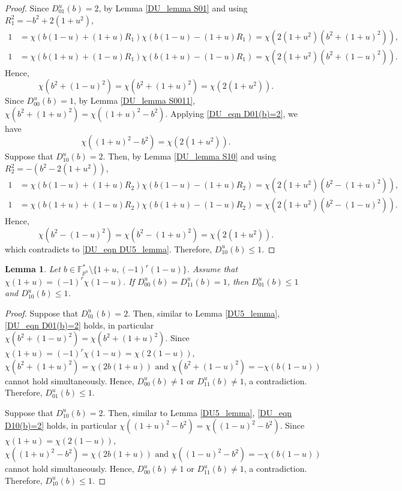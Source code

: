 \documentclass[11pt]{article}
\numberwithin{theorem}{section}
\newtheorem{lemma}[theorem]{Lemma}
\newcommand{\Fpnmul}{\mathbb{F}_{p^n}^*}
\begin{document}
\begin{proof}
	Since $D_{01}^u(b)=2$, by Lemma \ref{DU_lemma S01} and using $R_1^2=-b^2+2(1+u^2)$,
	\begin{align*}
		1&=\chi(b(1-u)+(1+u)R_1)\chi(b(1-u)-(1+u)R_1)  =\chi(2(1+u^2)(b^2+(1+u)^2)),\\
		1&=\chi(b(1+u)+(1-u)R_1)\chi(b(1+u)-(1-u)R_1) =\chi(2(1+u^2)(b^2+(1-u)^2)).
	\end{align*}
	Hence, 
	\begin{equation}\label{DU_eqn D01(b)=2}
		\chi(b^2+(1-u)^2)=\chi(b^2+(1+u)^2)=\chi(2(1+u^2)).
	\end{equation}
	Since $D_{00}^u(b)=1$, by Lemma \ref{DU_lemma S0011}, $\chi(b^2+(1+u)^2)=\chi((1+u)^2-b^2)$. Applying \eqref{DU_eqn D01(b)=2}, we have 
	\begin{equation}\label{DU_eqn DU5_lemma}
		\chi((1+u)^2-b^2)=\chi(2(1+u^2)).
	\end{equation}
	Suppose that $D_{10}^u(b)=2$. Then, by Lemma \ref{DU_lemma S10} and using $R_2^2=-\left(b^2-2(1+u^2)\right)$, 
	\begin{align*}
		1&=\chi(b(1-u)+(1+u)R_2)\chi(b(1-u)-(1+u)R_2) =\chi(2(1+u^2)(b^2-(1+u)^2)),\\
		1&=\chi(b(1+u)+(1-u)R_2)\chi(b(1+u)-(1-u)R_2) =\chi(2(1+u^2)(b^2-(1-u)^2)).
	\end{align*}
	Hence, 
	\begin{equation}\label{DU_eqn D10(b)=2}
		\chi(b^2-(1-u)^2)=\chi(b^2-(1+u)^2)=\chi(2(1+u^2)).
	\end{equation}
	which contradicts to \eqref{DU_eqn DU5_lemma}. Therefore, $D_{10}^u(b) \le 1$.
\end{proof}

\begin{lemma}\label{DU4_lemma}
	Let $b\in \Fpnmul\setminus  \{1+u, (-1)^r(1-u)\}$. Assume that $\chi(1+u)=(-1)^r\chi(1-u)$. If $D_{00}^u(b)=D_{11}^u(b)=1$, then $D_{01}^u(b)\le 1$ and $D_{10}^u(b)\le 1$.
\end{lemma}
\begin{proof}
		Suppose that $D_{01}^u(b)=2$. Then, similar to Lemma \ref{DU5_lemma}, \eqref{DU_eqn D01(b)=2} holds, in particular $\chi(b^2+(1-u)^2)=\chi(b^2+(1+u)^2)$. Since $\chi(1+u)=(-1)^r\chi(1-u)=\chi(2(1-u))$,
	\begin{equation*} 
		\chi(b^2+(1+u)^2)=\chi(2b(1+u))\text{ and } \chi(b^2+(1-u)^2)=-\chi(b(1-u))
	\end{equation*} 
	cannot hold simultaneously. Hence, $D_{00}^u(b)\ne 1$ or $D_{11}^u(b) \ne 1$, a contradiction. Therefore,  $D_{01}^u(b)\le 1$.
	
	Suppose that $D_{10}^u(b)=2$. Then, similar to Lemma \ref{DU5_lemma}, \eqref{DU_eqn D10(b)=2} holds, in particular $\chi((1+u)^2-b^2)=\chi((1-u)^2-b^2)$. Since $\chi(1+u)=\chi(2(1-u))$, \begin{equation*} 
		\chi((1+u)^2-b^2)=\chi(2b(1+u))\text{ and } \chi((1-u)^2-b^2)=-\chi(b(1-u))
	\end{equation*} 
	cannot hold simultaneously. Hence, $D_{00}^u(b)\ne 1$ or $D_{11}^u(b) \ne 1$, a contradiction. Therefore,  $D_{10}^u(b)\le 1$.
\end{proof}
\end{document}
